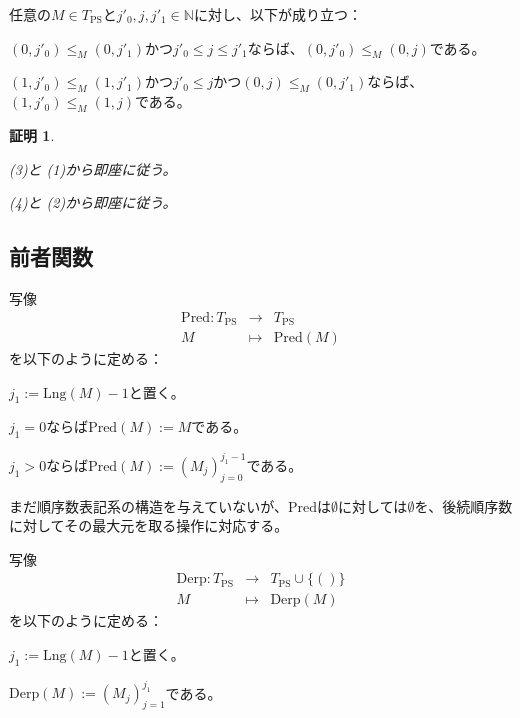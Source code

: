 \documentclass[dvipdfmx,uplatex]{jsarticle}
\theoremstyle{customnonumberbreakfortheorem}
\theoremstyle{customnonumberbreakforproof}
\newtheorem{hideableproof}{証明}
\begin{document}
\begin{corollary}[直系先祖の木構造]\label{直系先祖の木構造}
	任意の\(M \in T_{\textrm{PS}}\)と\(j'_0, j, j'_1 \in \mathbb{N}\)に対し、以下が成り立つ：
	\begin{penumerate}
		\item \((0,j'_0) \leq_M (0,j'_1)\)かつ\(j'_0 \leq j \leq j'_1\)ならば、\((0,j'_0) \leq_M (0,j)\)である。
		\item \((1,j'_0) \leq_M (1,j'_1)\)かつ\(j'_0 \leq j\)かつ\((0,j) \leq_M (0,j'_1)\)ならば、\((1,j'_0) \leq_M (1,j)\)である。
	\end{penumerate}
\end{corollary}

\begin{hideableproof}
	\begin{penumerate}
		\item {} (3)と (1)から即座に従う。
		\item {} (4)と (2)から即座に従う。
	\end{penumerate}
\end{hideableproof}


\subsection{前者関数}

写像
\begin{eqnarray*}
\textrm{Pred} \colon T_{\textrm{PS}} & \to & T_{\textrm{PS}} \\
M & \mapsto & \textrm{Pred}(M)
\end{eqnarray*}
を以下のように定める：
\begin{nenumerate}
	\item \(j_1 := \textrm{Lng}(M)-1\)と置く。
	\item \(j_1 = 0\)ならば\(\textrm{Pred}(M) := M\)である。
	\item \(j_1 > 0\)ならば\(\textrm{Pred}(M) := (M_j)_{j=0}^{j_1-1}\)である。
\end{nenumerate}

まだ順序数表記系の構造を与えていないが、\(\textrm{Pred}\)は\(\emptyset\)に対しては\(\emptyset\)を、後続順序数に対してその最大元を取る操作に対応する。

写像
\begin{eqnarray*}
\textrm{Derp} \colon T_{\textrm{PS}} & \to & T_{\textrm{PS}} \cup \{()\} \\
M & \mapsto & \textrm{Derp}(M)
\end{eqnarray*}
を以下のように定める：
\begin{nenumerate}
	\item \(j_1 := \textrm{Lng}(M)-1\)と置く。
	\item \(\textrm{Derp}(M) := (M_j)_{j=1}^{j_1}\)である。
\end{nenumerate}
\end{document}
